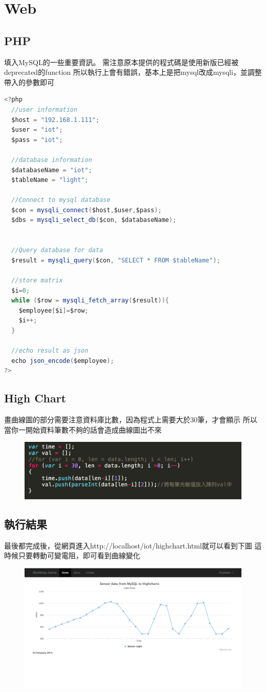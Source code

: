 \documentclass[12pt,a4paper]{article}
\begin{document}
\section{Web}
{
\subsection{PHP}
填入MySQL的一些重要資訊。
需注意原本提供的程式碼是使用新版已經被deprecated的function
所以執行上會有錯誤，基本上是把mysql改成mysqli，並調整帶入的參數即可
\begin{shaded}
\begin{lstlisting}[language=Java]
<?php
  //user information
  $host = "192.168.1.111";
  $user = "iot";
  $pass = "iot";

  //database information
  $databaseName = "iot";
  $tableName = "light";

  //Connect to mysql database
  $con = mysqli_connect($host,$user,$pass);
  $dbs = mysqli_select_db($con, $databaseName);


  //Query database for data
  $result = mysqli_query($con, "SELECT * FROM $tableName");

  //store matrix
  $i=0;
  while ($row = mysqli_fetch_array($result)){
    $employee[$i]=$row;
    $i++;
  }

  //echo result as json 
  echo json_encode($employee);
?>
\end{lstlisting}
\end{shaded}

\newpage
\subsection{High Chart}
畫曲線圖的部分需要注意資料庫比數，因為程式上需要大於30筆，才會顯示
所以當你一開始資料筆數不夠的話會造成曲線圖出不來
\begin{figure}[ht]
\centering
\includegraphics[width=1.0\textwidth]{image/highchart.jpg}
\end{figure}

\subsection{執行結果}
最後都完成後，從網頁進入http://localhost/iot/highchart.html就可以看到下圖
這時候只要轉動可變電阻，即可看到曲線變化
\begin{figure}[ht]
\centering
\includegraphics[width=1.0\textwidth]{image/highcharts.jpg}
\end{figure}
}
\end{document}
